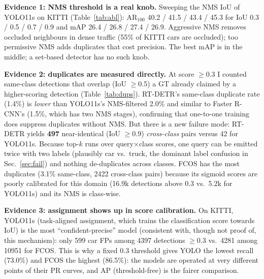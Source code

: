 \documentclass[10pt]{article}
\newcommand{\tb}[1]{\resizebox{\linewidth}{!}{#1}}
\begin{document}
\textbf{Evidence 1: NMS threshold is a real knob.} Sweeping the NMS IoU of YOLO11s on KITTI (Table~\ref{tab:abl}): AR$_{100}$ 40.2 / 41.5 / 43.4 / 45.3 for IoU 0.3 / 0.5 / 0.7 / 0.9 and mAP 26.4 / 26.8 / 27.4 / 26.9. Aggressive NMS removes occluded neighbours in dense traffic (55\% of KITTI cars are occluded); too permissive NMS adds duplicates that cost precision. The best mAP is in the middle; a set-based detector has no such knob.

\textbf{Evidence 2: duplicates are measured directly.} At score $\ge$0.3 I counted same-class detections that overlap (IoU $\ge$0.5) a GT already claimed by a higher-scoring detection (Table~\ref{tab:dups}). RT-DETR's same-class duplicate rate (1.4\%) is \emph{lower} than YOLO11s's NMS-filtered 2.0\% and similar to Faster R-CNN's (1.5\%, which has two NMS stages), confirming that one-to-one training does suppress duplicates without NMS. But there is a new failure mode: RT-DETR yields \textbf{497} near-identical (IoU $\ge$0.9) \emph{cross-class} pairs versus 42 for YOLO11s. Because top-$k$ runs over query$\times$class scores, one query can be emitted twice with two labels (plausibly car vs.\ truck, the dominant label confusion in Sec.~\ref{sec:fail}) and nothing de-duplicates across classes. FCOS has the most duplicates (3.1\% same-class, 2422 cross-class pairs) because its sigmoid scores are poorly calibrated for this domain (16.9k detections above 0.3 vs.\ 5.2k for YOLO11s) and its NMS is class-wise.

\textbf{Evidence 3: assignment shows up in score calibration.} On KITTI, YOLO11s (task-aligned assignment, which trains the classification score towards IoU) is the most ``confident-precise'' model (consistent with, though not proof of, this mechanism): only 599 car FPs among 4397 detections $\ge$0.3 vs.\ 4281 among 10951 for FCOS. This is why a fixed 0.3 threshold gives YOLO the lowest recall (73.0\%) and FCOS the highest (86.5\%): the models are operated at very different points of their PR curves, and AP (threshold-free) is the fairer comparison.

\begin{table}[t]\centering\footnotesize
\caption{Duplicate and false-positive statistics on KITTI at score $\ge$0.3 (only person/car/truck detections; FP = no same-class GT with IoU $\ge$0.5 and not inside an ignore region).}\label{tab:dups}
\tb{}
\end{table}
\end{document}
